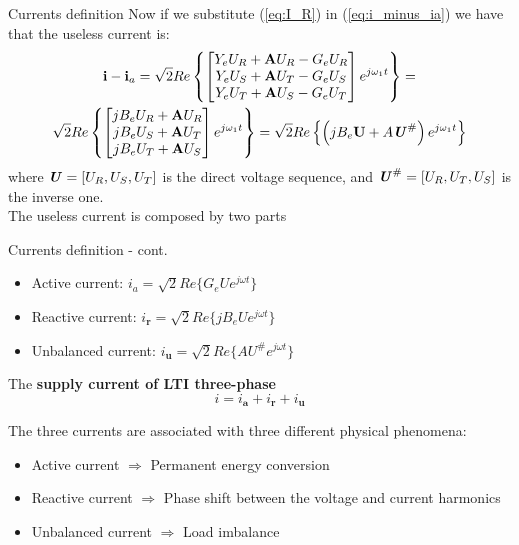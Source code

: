 \documentclass[aspectratio=169]{beamer}
\begin{document}
\begin{frame}{Currents definition}{\insertsection}
    Now if we substitute (\ref{eq:I_R}) in (\ref{eq:i_minus_ia}) we have that the useless current is:
    \begin{gather}
        \textbf{i} - \textbf{i}_a = \sqrt{2} Re\left\{
        \begin{bmatrix}
        Y_e U_R + \textbf{A} U_R - G_e U_R \\
        Y_e U_S + \textbf{A} U_T - G_e U_S \\
        Y_e U_T + \textbf{A} U_S - G_e U_T
        \end{bmatrix}
e^{j\omega_1t}\right\} = \notag \\
\sqrt{2} Re\left\{
        \begin{bmatrix}
        j B_e U_R + \textbf{A} U_R \\
        j B_e U_S + \textbf{A} U_T \\
        j B_e U_T + \textbf{A} U_S 
        \end{bmatrix}
e^{j\omega_1t}\right\} = \sqrt{2} Re\left\{\left(jB_e\textbf{U} + A\textbf{\textit{U}}^{\#}\right)e^{j\omega_1t}\right\} 
    \end{gather}
     where $\textbf{\textit{U}} = \left[U_R, U_S, U_T\right]$ is the direct voltage sequence, and $\textbf{\textit{U}}^{\#} = \left[U_R, U_T, U_S\right]$ is the inverse one.\\
     \textcolor{NTNU_orange}{The useless current is composed by two parts}
\end{frame}

\begin{frame}{Currents definition - cont.}{\insertsection}
    \begin{itemize}
      \item Active current: $\pmb{\mathit{i}}_{a} = \sqrt{2}Re\{G_e\pmb{\mathit{U}}e^{j\omega t}\}$
      \item Reactive current: $\pmb{\mathit{i}_{r}} = \sqrt{2}Re\{jB_e\pmb{\mathit{U}}e^{j\omega t}\}$
      \item Unbalanced current: $\pmb{\mathit{i}_{u}} = \sqrt{2}Re\{A\pmb{\mathit{U}}^{\#}e^{j\omega t}\}$
    \end{itemize}

    The \textbf{supply current of LTI three-phase}
    \begin{equation}
      \pmb{\mathit{i}} = \pmb{\mathit{i}_{a}} + \pmb{\mathit{i}_{r}} + \pmb{\mathit{i}_{u}}
    \end{equation}

    The three currents are associated with three different physical phenomena:
    \begin{itemize}
      \item Active current $\Rightarrow$ Permanent energy conversion
      \item Reactive current $\Rightarrow$ Phase shift between the voltage and current harmonics
      \item Unbalanced current $\Rightarrow$ Load imbalance
    \end{itemize}
  \end{frame}
\end{document}
